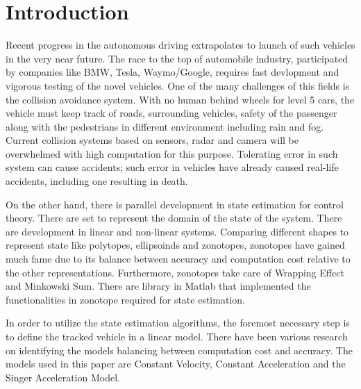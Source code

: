 \chapter{Introduction} \label{ch:intro}
Recent progress in the autonomous driving extrapolates to launch of such vehicles in the very near future. The race to the top of automobile industry, participated by companies like BMW, Tesla, Waymo/Google, requires fast devlopment and vigorous testing of the novel vehicles. One of the many challenges of this fields is the collision avoidance system. With no human behind wheels for level 5 cars, the vehicle must keep track of roads, surrounding vehicles, safety of the passenger along with the pedestrians in different environment including rain and fog. Current collision systems based on sensors, radar and camera will be overwhelmed with high computation for this purpose. Tolerating error in such system can cause accidents; such error in vehicles have already caused real-life accidents, including one resulting in death.


On the other hand, there is parallel development in state estimation for control theory. There are set to represent the domain of the state of the system. There are development in linear and non-linear systems. Comparing different shapes to represent state like polytopes, ellipsoinds and zonotopes, zonotopes have gained much fame due to its balance between accuracy and computation cost relative to the other representations. Furthermore, zonotopes take care of Wrapping Effect and Minkowski Sum. There are library in Matlab that implemented the functionalities in zonotope required for state estimation.

In order to utilize the state estimation algorithms, the foremost necessary step is to define the tracked vehicle in a linear model. There have been various research on identifying the models balancing between computation cost and accuracy. The models used in this paper are Constant Velocity, Constant Acceleration and the Singer Acceleration Model.





